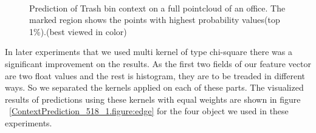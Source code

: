 \begin{figure} [htp]
   \begin{center}
     \\
  \end{center}
  \caption[Prediction of Trash bin model.]
  {Prediction of Trash bin context on a full pointcloud of an office. The marked region shows the points with highest probability values(top 1\%).(best viewed in color)}
  \label{TrashPrediction.figure:edge}
\end{figure}

In later experiments that we used multi kernel of type chi-square there was a significant improvement on the results.
As the first two fields of our feature vector are two float values and the rest is histogram, they are to be treaded 
in different ways.
So we separated the kernels applied on each of these parts.
The visualized results of predictions using these kernels with equal weights are shown in figure ~\ref{ContextPrediction_518_1.figure:edge} 
for the four object we used in these experiments.

